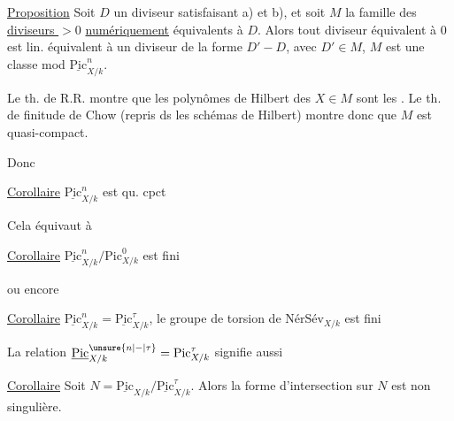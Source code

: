 \uline{Proposition} Soit $D$ un diviseur satisfaisant a) et b), et soit $M$ la famille des \uline{diviseurs $>0$} \uline{numériquement} équivalents à $D$. Alors tout diviseur  équivalent à $0$ est lin. équivalent à un diviseur de la forme $D'-D$, avec $D'\in M$,   $M$ est une classe mod $\underline{\mathrm{Pic}}^n_{X/k}$.

Le th. de  R.R.  montre que les polynômes de Hilbert des $X\in M$ sont les . Le th. de finitude de Chow (repris ds les schémas de Hilbert) montre donc que $M$ est quasi-compact.

Donc

\uline{Corollaire} $\underline{\mathrm{Pic}}^n_{X/k}$ est qu. cpct 

Cela équivaut à

\uline{Corollaire} $\underline{\mathrm{Pic}}^n_{X/k}/\mathrm{Pic}^0_{X/k}$ est fini

ou encore

\uline{Corollaire} $\underline{\mathrm{Pic}}^n_{X/k}=\underline{\mathrm{Pic}}^\tau_{X/k}$, le groupe de torsion  de $\text{NérSév}_{X/k}$ est fini

La relation $\underline{\mathrm{Pic}}^{\unsure{n|-|\tau}}_{X/k}=\mathrm{Pic}^\tau_{X/k}$ signifie aussi

\uline{Corollaire} Soit $N=\underline{\mathrm{Pic}}_{X/k}/\underline{\mathrm{Pic}}^\tau_{X/k}$. Alors la forme d'intersection sur $N$ est non singulière.


